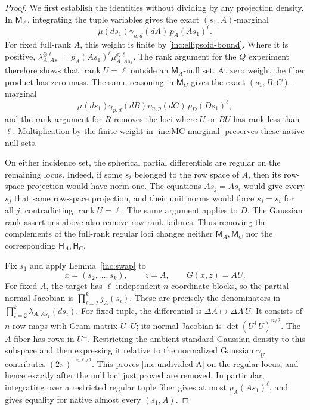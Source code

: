 \begin{proof}
We first establish the identities without dividing by any projection
density.  In \(\mathsf M_A\), integrating the tuple variables gives the
exact \((s_1,A)\)-marginal
\begin{equation}\label{inc:MA-marginal}
 \mu(ds_1)\gamma_{n,d}(dA)\,p_A(As_1)^\ell.
\end{equation}
For fixed full-rank \(A\), this weight is finite by
\eqref{inc:ellipsoid-bound}.  Where it is positive,
\(\lambda_{A,As_1}^{\otimes\ell}
=p_A(As_1)^\ell\mu_{A,As_1}^{\otimes\ell}\).
The rank argument for the \(Q\) experiment therefore shows that
\(\operatorname{rank}U=\ell\) outside an \(\mathsf M_A\)-null set.
At zero weight the fiber product has zero mass.  The same reasoning in
\(\mathsf M_C\) gives the exact \((s_1,B,C)\)-marginal
\begin{equation}\label{inc:MC-marginal}
 \mu(ds_1)\gamma_{p,d}(dB)\upsilon_{n,p}(dC)\,p_D(Ds_1)^\ell,
\end{equation}
and the rank argument for \(R\) removes the loci where \(U\) or \(BU\)
has rank less than \(\ell\).  Multiplication by the finite weight in
\eqref{inc:MC-marginal} preserves these native null sets.

On either incidence set, the spherical partial differentials are
regular on the remaining locus.  Indeed, if some \(s_i\) belonged to
the row space of \(A\), then its row-space projection would have norm
one.  The equations \(As_j=As_i\) would give every \(s_j\) that same
row-space projection, and their unit norms would force \(s_j=s_i\)
for all \(j\), contradicting \(\operatorname{rank}U=\ell\).
The same argument applies to \(D\).  The Gaussian rank assertions
above also remove row-rank failures.  Thus removing the complements of
the full-rank regular loci changes neither \(\mathsf M_A,\mathsf M_C\)
nor the corresponding \(\mathsf H_A,\mathsf H_C\).

Fix \(s_1\) and apply Lemma~\ref{inc:swap} to
\[
 x=(s_2,\ldots,s_k),\qquad z=A,\qquad G(x,z)=AU.
\]
For fixed \(A\), the target has \(\ell\) independent \(n\)-coordinate
blocks, so the partial normal Jacobian is
\(\prod_{i=2}^k j_A(s_i)\).  These are precisely the denominators in
\(\prod_{i=2}^k\lambda_{A,As_1}(ds_i)\).
For fixed tuple, the differential is \(\Delta A\mapsto\Delta A\,U\).
It consists of \(n\) row maps with Gram matrix \(U^{\mathsf T}U\);
its normal Jacobian is \(\det(U^{\mathsf T}U)^{n/2}\).
The \(A\)-fiber has rows in \(U^\perp\).  Restricting the ambient
standard Gaussian density to this subspace and then expressing it
relative to the normalized Gaussian \(\gamma_U\) contributes
\((2\pi)^{-n\ell/2}\).  This proves \eqref{inc:undivided-A} on the
regular locus, and hence exactly after the null loci just proved are
removed.  In particular, integrating over a restricted regular tuple
fiber gives at most \(p_A(As_1)^\ell\), and gives equality for native
almost every \((s_1,A)\).


\end{proof}
